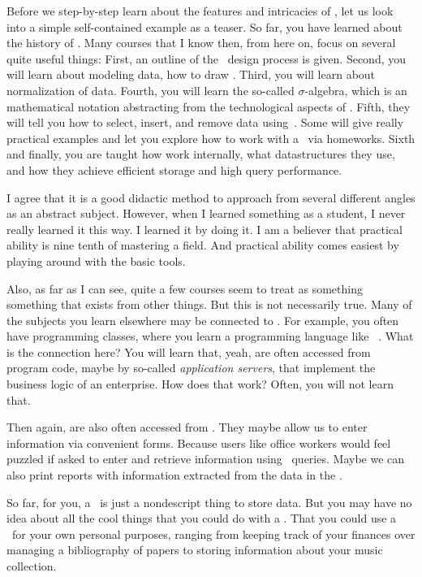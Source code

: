 \label{sec:simpleExampleIntro}%
Before we step-by-step learn about the features and intricacies of , let us look into a simple self-contained example as a teaser.
So far, you have learned about the history of .
Many courses that I know then, from here on, focus on several quite useful things:
First, an outline of the \db\ design process is given.
Second, you will learn about modeling data, how to draw .
Third, you will learn about normalization of data.
Fourth, you will learn the so-called $\sigma$\nobreakdashes-algebra, which is an mathematical notation abstracting from the technological aspects of .
Fifth, they will tell you how to select, insert, and remove data using~\sql.
Some will give really practical examples and let you explore how to work with a \db\ via homeworks.
Sixth and finally, you are taught how  work internally, what datastructures they use, and how they achieve efficient storage and high query performance.

I agree that it is a good didactic method to approach  from several different angles as an abstract subject.
However, when I learned something as a student, I never really learned it this way.
I learned it by doing it.
I am a believer that practical ability is nine tenth of mastering a field.
And practical ability comes easiest by playing around with the basic tools.

Also, as far as I can see, quite a few courses seem to treat  as something  something that exists  from other things.
But this is not necessarily true.
Many of the subjects you learn elsewhere may be connected to .
For example, you often have programming classes, where you learn a programming language like \python~\cite{programmingWithPython}.
What is the connection here?
You will learn that, yeah,  are often accessed from program code, maybe by so-called \emph{application servers}, that implement the business logic of an enterprise.
How does that work?
Often, you will not learn that.

Then again,  are also often accessed from .
They maybe allow us to enter information via convenient forms.
Because users like office workers would feel puzzled if asked to enter and retrieve information using \sql\ queries.
Maybe we can also print reports with information extracted from the data in the \db.

So far, for you, a \db\ is just a nondescript thing to store data.
But you may have no idea about all the cool things that you could do with a \db.
That you could use a \db\ for your own personal purposes, ranging from keeping track of your finances over managing a bibliography of papers to storing information about your music collection.

